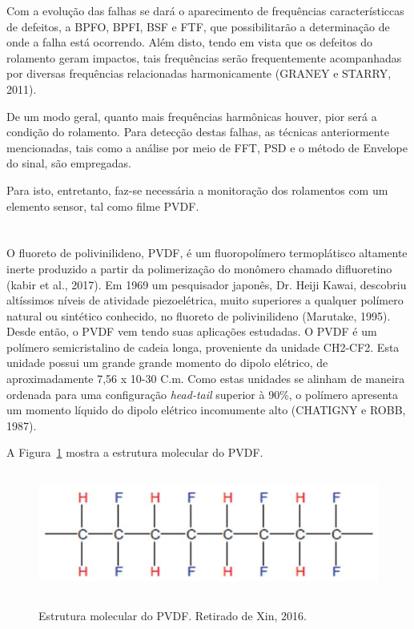 \documentclass[
	12pt,				
	oneside,			
	a4paper,			
	english,			
	brazil,			
	]{abntex2ppgsi}
\begin{document}
Com a evolução das falhas se dará o aparecimento de frequências característiccas de defeitos, a BPFO, BPFI, BSF e FTF, que possibilitarão a determinação de onde a falha está ocorrendo. Além disto, tendo em vista que os defeitos do rolamento geram impactos, tais frequências serão frequentemente acompanhadas por diversas frequências relacionadas harmonicamente (GRANEY e STARRY, 2011). 

De um modo geral, quanto mais frequências harmônicas houver, pior será a condição do rolamento. Para detecção destas falhas, as técnicas anteriormente mencionadas, tais como a análise por meio de FFT, PSD e o método de Envelope do sinal, são empregadas. 

Para isto, entretanto, faz-se necessária a monitoração dos rolamentos com um elemento sensor, tal como filme PVDF.

\newpage
\section{}

O fluoreto de polivinilideno, PVDF, é um fluoropolímero termoplátisco altamente inerte produzido a partir da polimerização do monômero chamado difluoretino (kabir et al., 2017). Em 1969 um pesquisador japonês, Dr. Heiji Kawai, descobriu altíssimos níveis de atividade piezoelétrica, muito superiores a qualquer polímero natural ou sintético conhecido, no fluoreto de polivinilideno (Marutake, 1995). Desde então, o PVDF vem tendo suas aplicações estudadas. O PVDF é um polímero semicristalino de cadeia longa, proveniente da unidade CH2-CF2. Esta unidade possui um grande grande momento do dipolo elétrico, de aproximadamente 7,56 x 10-30 C.m. Como estas unidades se alinham de maneira ordenada para uma configuração \textit{head-tail} superior à 90\%, o polímero apresenta um momento líquido do dipolo elétrico incomumente alto (CHATIGNY e ROBB, 1987).

A Figura~\ref{pvdf_cadeia} mostra a estrutura molecular do PVDF.

\begin{figure}[H]
\centering
\caption {Estrutura molecular do PVDF. Retirado de Xin, 2016.}
\includegraphics[width=\textwidth,height=40mm,keepaspectratio]{pvdf_cadeia}
\label{pvdf_cadeia}
\end{figure}
\end{document}
